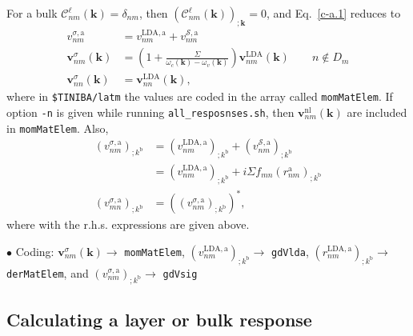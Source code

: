For a bulk $\mathcal{C}^\ell_{nm}(\mathbf{k})=\delta_{nm}$, then
$(\mathcal{C}^\ell_{nm}(\mathbf{k}))_{;\mathbf{k}}=0$, and Eq.~\eqref{c-a.1} reduces to
\begin{align}\label{choni.9}
v^{\sigma,\mathrm{a}}_{nm}
&=
v^{\mathrm{LDA},\mathrm{a}}_{nm}
+
v^{\mathcal{S},\mathrm{a}}_{nm}
\nonumber\\
\mathbf{v}^\sigma_{nm}(\mathbf{k})
&=
\left(1+\frac{\Sigma}{\omega_c(\mathbf{k})-\omega_v(\mathbf{k})}\right)\mathbf{v}^\mathrm{LDA}_{nm}(\mathbf{k})
\quad\quad n\notin D_m
\nonumber\\
\mathbf{v}^\sigma_{nn}(\mathbf{k})
&=
\mathbf{v}^\mathrm{LDA}_{nn}(\mathbf{k})
,
\end{align}
where in \verb=$TINIBA/latm= the values are coded in the array
called
\verb=momMatElem=.  
If option \verb=-n= is given while running
\verb=all_resposnses.sh=, then $\mathbf{v}^\mathrm{nl}_{nm}(\mathbf{k})$ are included in 
\verb=momMatElem=. 
Also,
\begin{align}\label{c-a.1nn}
\left(v^{\sigma,\mathrm{a}}_{nm}\right)_{;k^\mathrm{b}}
&=
\left(
v^{\mathrm{LDA},\mathrm{a}}_{nm}
\right)_{;k^\mathrm{b}}
+
\left(
v^{\mathcal{S},\mathrm{a}}_{nm}
\right)_{;k^\mathrm{b}}
\nonumber\\
&=
\left(
v^{\mathrm{LDA},\mathrm{a}}_{nm}
\right)_{;k^\mathrm{b}}
+
i\Sigma f_{mn}(r^\mathrm{a}_{nm})_{;k^\mathrm{b}}
\nonumber\\
\left(v^{\sigma,\mathrm{a}}_{mn}\right)_{;k^\mathrm{b}}
&=
\left(\left(v^{\sigma,\mathrm{a}}_{nm}\right)_{;k^\mathrm{b}}\right)^*
,
\end{align}
where with the r.h.s. expressions are given above. 

$\bullet$ Coding:
$\mathbf{v}^\sigma_{nm}(\mathbf{k})\to$ \verb=momMatElem=,
$\left(v^{\mathrm{LDA},\mathrm{a}}_{nm}\right)_{;k^\mathrm{b}}\to$ \verb=gdVlda=,
$\left(r^{\mathrm{LDA},\mathrm{a}}_{nm}\right)_{;k^\mathrm{b}}\to$ \verb=derMatElem=, and
$\left(v^{\sigma,\mathrm{a}}_{nm}\right)_{;k^\mathrm{b}}\to$ \verb=gdVsig=



\subsection{Calculating a layer or bulk response}

